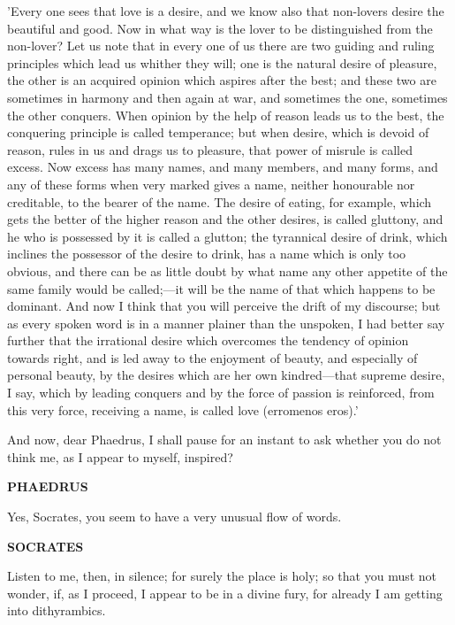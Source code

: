 \documentclass[11pt,letter]{article}
\begin{document}
\par  'Every one sees that love is a desire, and we know also that non-lovers desire the beautiful and good. Now in what way is the lover to be distinguished from the non-lover? Let us note that in every one of us there are two guiding and ruling principles which lead us whither they will; one is the natural desire of pleasure, the other is an acquired opinion which aspires after the best; and these two are sometimes in harmony and then again at war, and sometimes the one, sometimes the other conquers. When opinion by the help of reason leads us to the best, the conquering principle is called temperance; but when desire, which is devoid of reason, rules in us and drags us to pleasure, that power of misrule is called excess. Now excess has many names, and many members, and many forms, and any of these forms when very marked gives a name, neither honourable nor creditable, to the bearer of the name. The desire of eating, for example, which gets the better of the higher reason and the other desires, is called gluttony, and he who is possessed by it is called a glutton; the tyrannical desire of drink, which inclines the possessor of the desire to drink, has a name which is only too obvious, and there can be as little doubt by what name any other appetite of the same family would be called;—it will be the name of that which happens to be dominant. And now I think that you will perceive the drift of my discourse; but as every spoken word is in a manner plainer than the unspoken, I had better say further that the irrational desire which overcomes the tendency of opinion towards right, and is led away to the enjoyment of beauty, and especially of personal beauty, by the desires which are her own kindred—that supreme desire, I say, which by leading conquers and by the force of passion is reinforced, from this very force, receiving a name, is called love (erromenos eros).'

\par  And now, dear Phaedrus, I shall pause for an instant to ask whether you do not think me, as I appear to myself, inspired?

\par \textbf{PHAEDRUS}
\par   Yes, Socrates, you seem to have a very unusual flow of words.

\par \textbf{SOCRATES}
\par   Listen to me, then, in silence; for surely the place is holy; so that you must not wonder, if, as I proceed, I appear to be in a divine fury, for already I am getting into dithyrambics.
\end{document}
